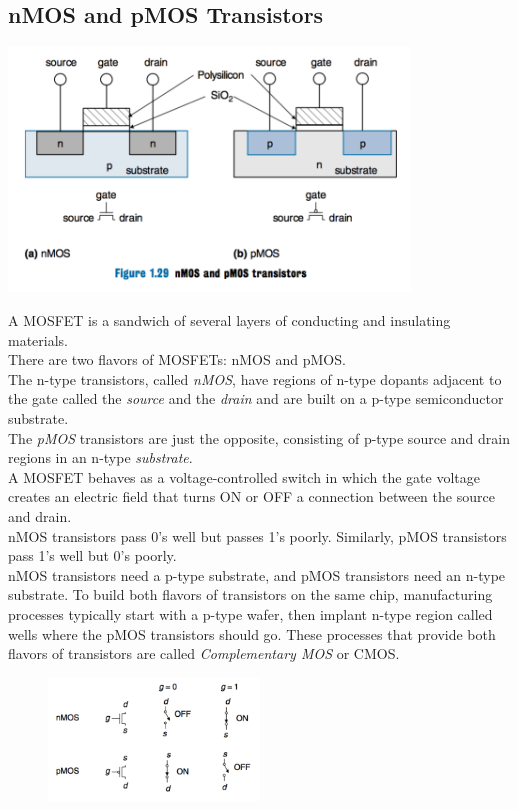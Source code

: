 \documentclass[12pt]{article}
\theoremstyle{definition}
\begin{document}
  \subsection{nMOS and pMOS Transistors}
  \begin{center}
    \includegraphics[width=0.8\textwidth]{pictures/nMOSpMOS.png}
  \end{center}
  A MOSFET is a sandwich of several layers of conducting and insulating materials. \\
  There are two flavors of MOSFETs: nMOS and pMOS. \\
  The n-type transistors, called \emph{nMOS}, have regions of n-type dopants adjacent to the gate called the \emph{source} and the \emph{drain} and are built on a p-type semiconductor substrate. \\
  The \emph{pMOS} transistors are just the opposite, consisting of p-type source and drain regions in an n-type \emph{substrate}. \\
  A MOSFET behaves as a voltage-controlled switch in which the gate voltage creates an electric field that turns ON or OFF a connection between the source and drain. \\
  nMOS transistors pass 0's well but passes 1's poorly.
  Similarly, pMOS transistors pass 1's well but 0's poorly. \\
  nMOS transistors need a p-type substrate, and pMOS transistors need an n-type substrate.
  To build both flavors of transistors on the same chip, manufacturing processes typically start with a p-type wafer, then implant n-type region called wells where the pMOS transistors should go.
  These processes that provide both flavors of transistors are called \emph{Complementary MOS} or CMOS.
  \begin{figure}
    \centering
    \includegraphics[width=0.5\textwidth]{pictures/nMOSpMOSGate.png}
  \end{figure}
\end{document}
